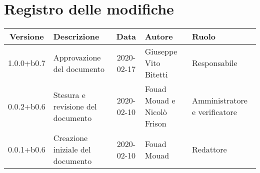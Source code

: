 \section*{Registro delle modifiche}

\begin{center}
	\begin{longtable}{|c|p{3.5cm}|c|p{3cm}|p{3cm}|}
	\hline
	\rowcolor{lighter-grayer}
	\textbf{Versione} & \textbf{Descrizione} & \textbf{Data} & \textbf{Autore} & \textbf{Ruolo} \\
	\hline
	\endfirsthead


	1.0.0+b0.7 & Approvazione del documento & 2020-02-17 & Giuseppe Vito Bitetti & Responsabile \\
	\hline
	0.0.2+b0.6 & Stesura e revisione del documento & 2020-02-10 & Fouad Mouad e Nicolò Frison & Amministratore e verificatore \\
	\hline
	0.0.1+b0.6 & Creazione iniziale del documento & 2020-02-10 & Fouad Mouad & Redattore \\
	\hline

	\end{longtable}
\end{center}